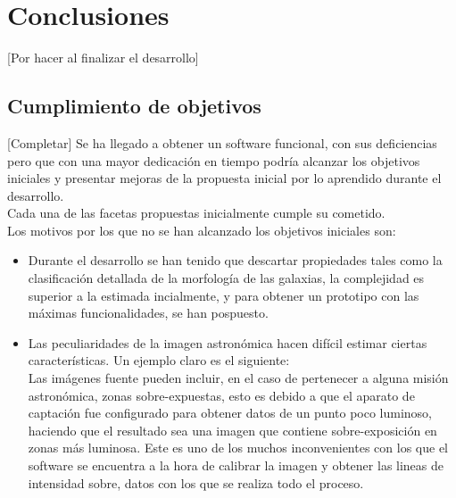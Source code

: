 	\section{Conclusiones}
	[Por hacer al finalizar el desarrollo]

	\subsection{Cumplimiento de objetivos}
	[Completar]
	Se ha llegado a obtener un software funcional, con sus deficiencias pero que con una mayor dedicación en tiempo podría alcanzar los objetivos iniciales y presentar mejoras de la propuesta inicial por lo aprendido durante el desarrollo.\\
	Cada una de las facetas propuestas inicialmente cumple su cometido.\\
	Los motivos por los que no se han alcanzado los objetivos iniciales son:\\
	\begin{itemize}
		\item Durante el desarrollo se han tenido que descartar propiedades tales como la clasificación detallada de la morfología de las galaxias, la complejidad es superior a la estimada incialmente, y para obtener un prototipo con las máximas funcionalidades, se han pospuesto.
		\item Las peculiaridades de la imagen astronómica hacen difícil estimar ciertas características. Un ejemplo claro es el siguiente:\\
			Las imágenes fuente pueden incluir, en el caso de pertenecer a alguna misión astronómica, zonas sobre-expuestas, esto es debido a que el aparato de captación fue configurado para obtener datos de un punto poco luminoso, haciendo que el resultado sea una imagen que contiene sobre-exposición en zonas más luminosa. Este es uno de los muchos inconvenientes con los que el software se encuentra a la hora de calibrar la imagen y obtener las lineas de intensidad sobre, datos con los que se realiza todo el proceso.
	\end{itemize}
